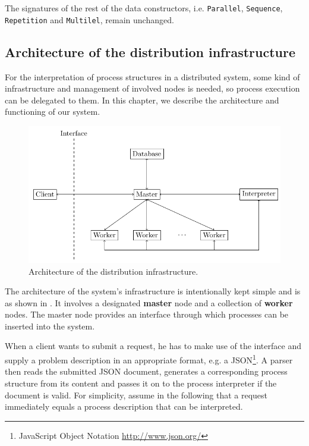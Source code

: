 The signatures of the rest of the data constructors, i.e. \texttt{Parallel}, \texttt{Sequence}, \texttt{Repetition} and \texttt{Multilel}, remain unchanged.

\subsection{Architecture of the distribution infrastructure}
\label{chp:infrastructure}
For the interpretation of process structures in a distributed system, some kind of infrastructure and management of involved nodes is needed, so process execution can be delegated to them. In this chapter, we describe the architecture and functioning of our system.
\begin{figure}[h!]
  \centering
  \includegraphics[width=\textwidth]{img/architecture.pdf}
  \caption{Architecture of the distribution infrastructure.}
  \label{fig:architecture}
\end{figure}

The architecture of the system's infrastructure is intentionally kept simple and is as shown in . It involves a designated \textbf{master} node and a collection of \textbf{worker} nodes. The master node provides an interface through which processes can be inserted into the system.

When a client wants to submit a request, he has to make use of the interface and supply a problem description in an appropriate format, e.g. a JSON\footnote{JavaScript Object Notation \url{http://www.json.org/}}. A parser then reads the submitted JSON document, generates a corresponding process structure from its content and passes it on to the process interpreter if the document is valid. For simplicity, assume in the following that a request immediately equals a process description that can be interpreted.


